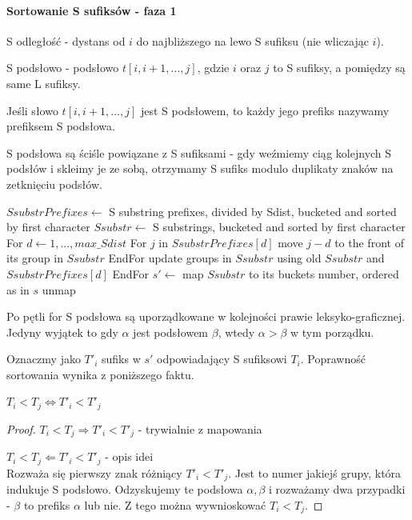 \paragraph{Sortowanie S sufiksów - faza 1}

\begin{definition}{}{}
S odległość - dystans od $i$ do najbliższego na lewo S sufiksu (nie wliczając $i$).
\end{definition}

\begin{definition}{}{}
S podsłowo - podsłowo $t[i,i+1,...,j]$, gdzie $i$ oraz $j$ to S sufiksy, a pomiędzy są same L sufiksy.
\end{definition}

\begin{definition}{}{}
Jeśli słowo $t[i,i+1,...,j]$ jest S podsłowem, to każdy jego prefiks nazywamy prefiksem S podsłowa.
\end{definition}

S podsłowa są ściśle powiązane z S sufiksami - gdy weźmiemy ciąg kolejnych S podsłów i skleimy je ze sobą, otrzymamy S sufiks modulo duplikaty znaków na zetknięciu podsłów.


\begin{algorithmic}
\State $SsubstrPrefixes \gets$ S substring prefixes, divided by Sdist, bucketed and sorted by first character
\State $Ssubstr \gets$ S substrings, bucketed and sorted by first character
\State For $d \gets 1,...,max\_Sdist$
\State For $j$ in $SsubstrPrefixes[d]$
\State move $j-d$ to the front of its group in $Ssubstr$
\State EndFor
\State update groups in $Ssubstr$ using old $Ssubstr$ and $SsubstrPrefixes[d]$ 
\State EndFor
\State $s' \gets$ map $Ssubstr$ to its buckets number, ordered as in $s$
\State \Return unmap 
\EndProcedure
\end{algorithmic}

Po pętli for S podsłowa są uporządkowane w kolejności prawie leksyko-graficznej. Jedyny wyjątek to gdy $\alpha$ jest podsłowem $\beta$, wtedy $\alpha > \beta$ w tym porządku.

Oznaczmy jako $T'_i$ sufiks w $s'$ odpowiadający S sufiksowi $T_i$. Poprawność sortowania wynika z poniższego faktu.

\begin{lemma}{}{}
$T_i < T_j \iff T'_i < T'_j$
\end{lemma}
\begin{proof}
\item[$T_i < T_j \Rightarrow T'_i < T'_j$] - trywialnie z mapowania
\item[$T_i < T_j \Leftarrow T'_i < T'_j$] - opis idei\\
Rozważa się pierwszy znak różniący $T'_i < T'_j$. Jest to numer jakiejś grupy, która indukuje S podsłowo. Odzyskujemy te podsłowa $\alpha,\beta$ i rozważamy dwa przypadki - $\beta$ to prefiks $\alpha$ lub nie. Z tego można wywnioskować $T_i < T_j$.
\end{proof}


